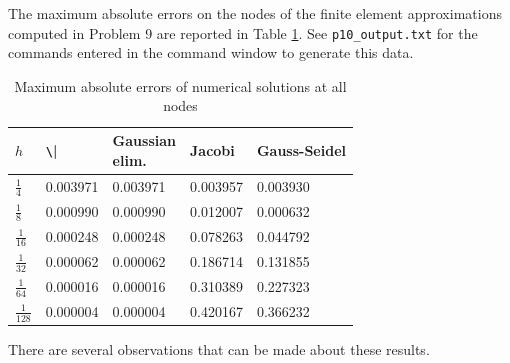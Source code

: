 \documentclass{homework}
\begin{document}
	\question
	The maximum absolute errors on the nodes of the finite element approximations computed in Problem 9 are reported in Table \ref{table:p10}. See \verb*|p10_output.txt| for the commands entered in the command window to generate this data.
	\begin{table}[h]
		\centering
		\begin{tabular}{@{}lllll@{}}
			\toprule
			$h$ & \verb*|\| & \makecell{Gaussian \\ elim.} & Jacobi & Gauss-Seidel \\
			\midrule
			$\frac{1}{4}$ & 0.003971 & 0.003971 & 0.003957 & 0.003930 \\[.4em]
			$\frac{1}{8}$ & 0.000990 & 0.000990 & 0.012007 & 0.000632 \\[.4em]
			$\frac{1}{16}$ & 0.000248 & 0.000248 & 0.078263 & 0.044792 \\[.4em]
			$\frac{1}{32}$ & 0.000062 & 0.000062 & 0.186714 & 0.131855 \\[.4em]
			$\frac{1}{64}$ & 0.000016 & 0.000016 & 0.310389 & 0.227323 \\[.4em]
			$\frac{1}{128}$ & 0.000004 & 0.000004 & 0.420167 & 0.366232 \\[.4em]
			\bottomrule
		\end{tabular}
		\caption{Maximum absolute errors of numerical solutions at all nodes}
		\label{table:p10}
	\end{table}
	There are several observations that can be made about these results.
\end{document}

